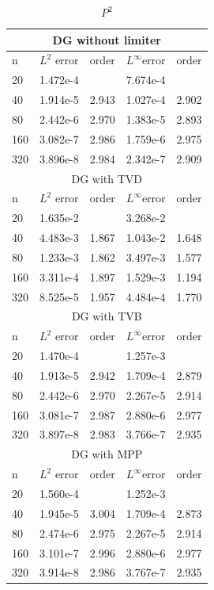 \documentclass[12pt, a4paper]{ctexart}
\begin{document}
	\begin{table}[htbp]
		\centering
		\caption{$P^2$}
		\begin{tabular}{| p{50pt}<{\centering} | p{60pt}<{\centering} | p{60pt}<{\centering} || p{60pt}<{\centering} | p{60pt}<{\centering}|}
			\hline
			\multicolumn{5}{|c|}{DG without limiter} \\
			\hline
			n & $L^2$ error & order & $L^\infty$error & order \\
			\hline
			20 & 1.472e-4 &  & 7.674e-4 &  \\
			\hline
			40 & 1.914e-5 & 2.943 & 1.027e-4 & 2.902\\
			\hline
			80 & 2.442e-6 & 2.970 & 1.383e-5 & 2.893\\
			\hline
			160 & 3.082e-7 & 2.986 & 1.759e-6 & 2.975\\
			\hline
			320 & 3.896e-8 & 2.984 & 2.342e-7 & 2.909\\
			\hline
			\multicolumn{5}{|c|}{DG with TVD} \\
			\hline
			n & $L^2$ error & order & $L^\infty$error & order \\
			\hline
			20 & 1.635e-2 &  & 3.268e-2 &  \\
			\hline
			40 & 4.483e-3 & 1.867 & 1.043e-2 & 1.648\\
			\hline
			80 & 1.233e-3 & 1.862 & 3.497e-3 & 1.577\\
			\hline
			160 & 3.311e-4 & 1.897 & 1.529e-3 & 1.194\\
			\hline
			320 & 8.525e-5 & 1.957 & 4.484e-4 & 1.770\\
			\hline
			\multicolumn{5}{|c|}{DG with TVB} \\
			\hline
			n & $L^2$ error & order & $L^\infty$error & order \\
			\hline
			20 & 1.470e-4 &  & 1.257e-3 &  \\
			\hline
			40 & 1.913e-5 & 2.942 & 1.709e-4 & 2.879\\
			\hline
			80 & 2.442e-6 & 2.970 & 2.267e-5 & 2.914\\
			\hline
			160 & 3.081e-7 & 2.987 & 2.880e-6 & 2.977\\
			\hline
			320 & 3.897e-8 & 2.983 & 3.766e-7 & 2.935\\
			\hline
			\multicolumn{5}{|c|}{DG with MPP} \\
			\hline
			n & $L^2$ error & order & $L^\infty$error & order \\
			\hline
			20 & 1.560e-4 &  & 1.252e-3 &  \\
			\hline
			40 & 1.945e-5 & 3.004 & 1.709e-4 & 2.873\\
			\hline
			80 & 2.474e-6 & 2.975 & 2.267e-5 & 2.914\\
			\hline
			160 & 3.101e-7 & 2.996 & 2.880e-6 & 2.977\\
			\hline
			320 & 3.914e-8 & 2.986 & 3.767e-7 & 2.935\\
			\hline
		\end{tabular}
	\end{table}
	
\end{document}
